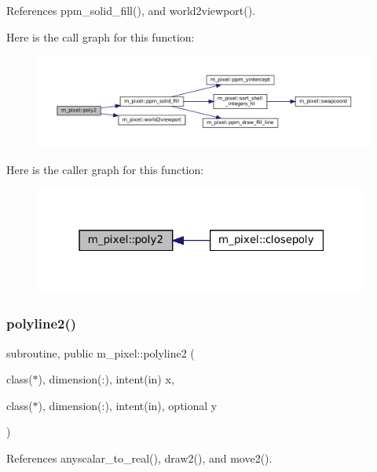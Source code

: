 References ppm\+\_\+solid\+\_\+fill(), and world2viewport().

Here is the call graph for this function\+:
\nopagebreak
\begin{figure}[H]
\begin{center}
\leavevmode
\includegraphics[width=350pt]{namespacem__pixel_a996117d631dce0e92056a0c486be5109_cgraph}
\end{center}
\end{figure}
Here is the caller graph for this function\+:
\nopagebreak
\begin{figure}[H]
\begin{center}
\leavevmode
\includegraphics[width=313pt]{namespacem__pixel_a996117d631dce0e92056a0c486be5109_icgraph}
\end{center}
\end{figure}
\mbox{\label{namespacem__pixel_a0678be124889fb633475a6724ddb6640}} 
\subsubsection{\texorpdfstring{polyline2()}{polyline2()}}
{\footnotesize\ttfamily subroutine, public m\+\_\+pixel\+::polyline2 (\begin{DoxyParamCaption}\item[{class($\ast$), dimension(\+:), intent(in)}]{x,  }\item[{class($\ast$), dimension(\+:), intent(in), optional}]{y }\end{DoxyParamCaption})}



References anyscalar\+\_\+to\+\_\+real(), draw2(), and move2().


